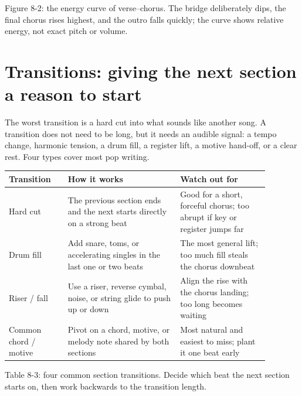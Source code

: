 \begin{center}
\begin{minipage}{0.94\linewidth}
\centering
{}

Figure 8-2: the energy curve of verse--chorus. The bridge deliberately dips, the final chorus rises highest, and the outro falls quickly; the curve shows relative energy, not exact pitch or volume.
\end{minipage}
\end{center}

\section{Transitions: giving the next section a reason to start}

The worst transition is a hard cut into what sounds like another song. A transition does not need to be long, but it needs an audible signal: a tempo change, harmonic tension, a drum fill, a register lift, a motive hand-off, or a clear rest. Four types cover most pop writing.

\begin{center}
\small
\begin{tabular}{p{0.20\linewidth}p{0.38\linewidth}p{0.30\linewidth}}
\toprule
Transition & How it works & Watch out for \\
\midrule
Hard cut & The previous section ends and the next starts directly on a strong beat & Good for a short, forceful chorus; too abrupt if key or register jumps far \\
Drum fill & Add snare, toms, or accelerating singles in the last one or two beats & The most general lift; too much fill steals the chorus downbeat \\
Riser / fall & Use a riser, reverse cymbal, noise, or string glide to push up or down & Align the rise with the chorus landing; too long becomes waiting \\
Common chord / motive & Pivot on a chord, motive, or melody note shared by both sections & Most natural and easiest to miss; plant it one beat early \\
\bottomrule
\end{tabular}

Table 8-3: four common section transitions. Decide which beat the next section starts on, then work backwards to the transition length.
\end{center}


